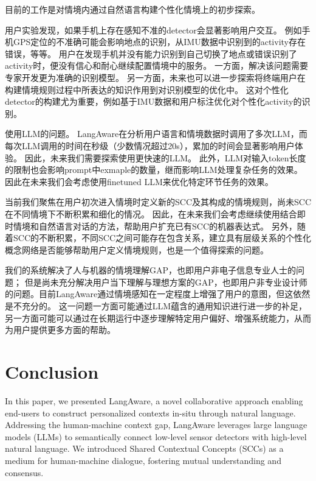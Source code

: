 目前的工作是对情境内通过自然语言构建个性化情境上的初步探索。

用户实验发现，如果手机上存在感知不准的detector会显著影响用户交互。
例如手机GPS定位的不准确可能会影响地点的识别，从IMU数据中识别到的activity存在错误，等等。
用户在发现手机并没有能力识别到自己切换了地点或错误识别了activity时，便没有信心和耐心继续配置情境中的服务。
一方面，解决该问题需要专家开发更为准确的识别模型。
另一方面，未来也可以进一步探索将终端用户在构建情境规则过程中所表达的知识作用到对识别模型的优化中。
这对个性化detector的构建尤为重要，例如基于IMU数据和用户标注优化对个性化activity的识别。

使用LLM的问题。
LangAware在分析用户语言和情境数据时调用了多次LLM，而每次LLM调用的时间在秒级（少数情况超过20s），累加的时间会显著影响用户体验。
因此，未来我们需要探索使用更快速的LLM。
此外，LLM对输入token长度的限制也会影响prompt中exmaple的数量，继而影响LLM处理复杂任务的效果。
因此在未来我们会考虑使用finetuned LLM来优化特定环节任务的效果。

当前我们聚焦在用户初次进入情境时定义新的SCC及其构成的情境规则，尚未SCC在不同情境下不断积累和细化的情况。
因此，在未来我们会考虑继续使用结合即时情境和自然语言对话的方法，帮助用户扩充已有SCC的机器表达式。
另外，随着SCC的不断积累，不同SCC之间可能存在包含关系，建立具有层级关系的个性化概念网络是否能够帮助用户定义情境规则，也是一个值得探索的问题。

我们的系统解决了人与机器的情境理解GAP，也即用户非电子信息专业人士的问题；
但是尚未充分解决用户当下理解与理想方案的GAP，也即用户非专业设计师的问题。目前LangAware通过情境感知在一定程度上增强了用户的意图，但这依然是不充分的。
这一问题一方面可能通过LLM蕴含的通用知识进行进一步的补足，另一方面可能可以通过在长期运行中逐步理解特定用户偏好、增强系统能力，从而为用户提供更多方面的帮助。




\section{Conclusion}

In this paper, we presented LangAware, a novel collaborative approach enabling end-users to construct personalized contexts in-situ through natural language. 
Addressing the human-machine context gap, LangAware leverages large language models (LLMs) to semantically connect low-level sensor detectors with high-level natural language. We introduced Shared Contextual Concepts (SCCs) as a medium for human-machine dialogue, fostering mutual understanding and consensus.

